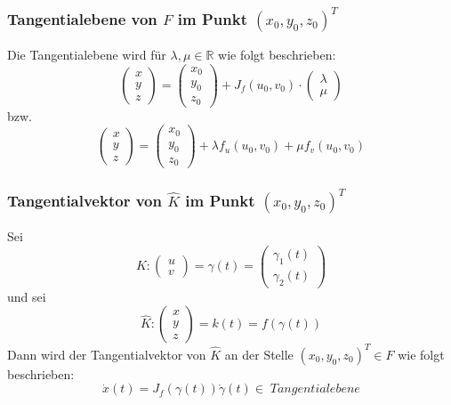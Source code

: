 \documentclass[a4paper,twocolumn,10pt]{article}
\begin{document}
\subsubsection{Tangentialebene von $F$ im Punkt $(x_0,y_0,z_0)^T$}
Die Tangentialebene wird für $\lambda,\mu\in\mathbb{R}$ wie folgt beschrieben:
\begin{equation*}
\begin{pmatrix}x \\ y \\z\end{pmatrix}=\begin{pmatrix}x_0 \\ y_0 \\ z_0\end{pmatrix}+J_f(u_0,v_0)\cdot\begin{pmatrix}\lambda \\ \mu\end{pmatrix}
\end{equation*}
bzw.
\begin{equation*}
\begin{pmatrix}x \\ y \\z\end{pmatrix}=\begin{pmatrix}x_0 \\ y_0 \\ z_0\end{pmatrix}+\lambda f_u(u_0,v_0)+\mu f_v(u_0,v_0)
\end{equation*}

\subsubsection{Tangentialvektor von $\hat{K}$ im Punkt $(x_0,y_0,z_0)^T$}
Sei
\begin{equation*}
K:\begin{pmatrix}u \\ v\end{pmatrix}=\gamma(t)=\begin{pmatrix}\gamma_1(t) \\ \gamma_2(t)\end{pmatrix}
\end{equation*}
und sei
\begin{equation*}
\hat{K}:\begin{pmatrix}x \\ y \\ z\end{pmatrix}=k(t)=f(\gamma(t))
\end{equation*}
Dann wird der Tangentialvektor von $\hat{K}$ an der Stelle $(x_0,y_0,z_0)^T \in F$ wie folgt beschrieben:
\begin{equation*}
\dot{x}(t)=J_f(\gamma(t)) \dot{\gamma}(t)\in\;Tangentialebene
\end{equation*}
\end{document}
